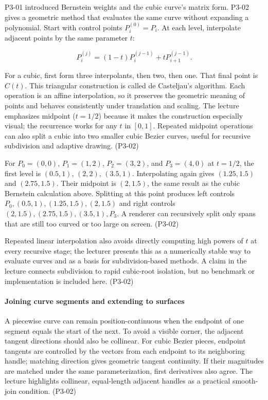 P3-01 introduced Bernstein weights and the cubic curve's matrix form. P3-02 gives a geometric method that evaluates the same curve without expanding a polynomial. Start with control points \(P_i^{(0)}=P_i\). At each level, interpolate adjacent points by the same parameter \(t\):

\[
P_i^{(j)}=(1-t)P_i^{(j-1)}+tP_{i+1}^{(j-1)}.
\]

For a cubic, first form three interpolants, then two, then one. That final point is \(C(t)\). This triangular construction is called de Casteljau's algorithm. Each operation is an affine interpolation, so it preserves the geometric meaning of points and behaves consistently under translation and scaling. The lecture emphasizes midpoint (\(t=1/2\)) because it makes the construction especially visual; the recurrence works for any \(t\) in \([0,1]\). Repeated midpoint operations can also split a cubic into two smaller cubic Bezier curves, useful for recursive subdivision and adaptive drawing. (P3-02)

For \(P_0=(0,0)\), \(P_1=(1,2)\), \(P_2=(3,2)\), and \(P_3=(4,0)\) at \(t=1/2\), the first level is \((0.5,1)\), \((2,2)\), \((3.5,1)\). Interpolating again gives \((1.25,1.5)\) and \((2.75,1.5)\). Their midpoint is \((2,1.5)\), the same result as the cubic Bernstein calculation above. Splitting at this point produces left controls \(P_0,(0.5,1),(1.25,1.5),(2,1.5)\) and right controls \((2,1.5),(2.75,1.5),(3.5,1),P_3\). A renderer can recursively split only spans that are still too curved or too large on screen. (P3-02)

Repeated linear interpolation also avoids directly computing high powers of \(t\) at every recursive stage; the lecturer presents this as a numerically stable way to evaluate curves and as a basis for subdivision-based methods. A claim in the lecture connects subdivision to rapid cubic-root isolation, but no benchmark or implementation is included here. (P3-02)

\paragraph{Joining curve segments and extending to surfaces}\label{03-visual-computing-i-ch001-joining-curve-segments-and-extending-to-surfaces}

A piecewise curve can remain position-continuous when the endpoint of one segment equals the start of the next. To avoid a visible corner, the adjacent tangent directions should also be collinear. For cubic Bezier pieces, endpoint tangents are controlled by the vectors from each endpoint to its neighboring handle; matching direction gives geometric tangent continuity. If their magnitudes are matched under the same parameterization, first derivatives also agree. The lecture highlights collinear, equal-length adjacent handles as a practical smooth-join condition. (P3-02)

